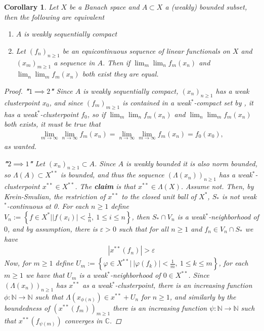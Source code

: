 \documentclass[10pt,twoside,openany,final]{memoir}
\theoremstyle{break}
\newtheorem{corollary}[section]{Corollary}
\theoremstyle{Break}
\newcommand{\C}{\mathbb{C}}
\newcommand{\N}{\mathbb{N}}
\begin{document}
\begin{corollary} \label{corollary of eberlein-smulian}
Let $X$ be a Banach space and $A\subset X$ a (weakly) bounded subset, then the following are equivalent
\begin{enumerate}
\item $A$ is weakly sequentially compact
\item Let $(f_{n})_{n\geq 1}$ be an equicontinuous sequence of linear functionals on $X$ and $(x_{m})_{m\geq 1}$ a sequence in $A$. Then if $\lim_{m} \lim_{n} f_{m} (x_{n})$ and $\lim_{n} \lim_{m} f_{m} (x_{n})$ both exist they are equal.
\end{enumerate}
\begin{proof}
\textbf{"$1 \implies 2$"}
Since $A$ is weakly sequentially compact, $(x_{n})_{n\geq 1}$ has a weak clusterpoint $x_{0}$, and since $(f_{m})_{m\geq1}$ is contained in a weak$^*$-compact set by , it has a weak$^*$-clusterpoint $f_{0}$, so if $\lim_{m} \lim_{n} f_{m} (x_{n})$ and $\lim_{n} \lim_{m} f_{m} (x_{n})$ both exists, it must be true that
\begin{align*}
\lim_{m\to \infty} \lim_{n\to \infty} f_{m}(x_{n})= \lim_{n\to \infty} \lim_{m \to \infty} f_{m}(x_{n})=f_{0}(x_{0}),
\end{align*}
as wanted.

\noindent \textbf{"$2 \implies 1$"} Let $(x_{n})_{n\geq 1} \subset A$. Since $A$ is weakly bounded it is also norm bounded, so $\Lambda(A)\subset X^{**}$ is bounded, and thus the sequence $(\Lambda(x_{n}))_{n\geq 1}$ has a weak$^*$-clusterpoint $x^{**}\in X^{**}$. The \textbf{claim} is that $x^{**} \in \Lambda(X)$. Assume not. Then, by Krein-Smulian, the restriction of $x^{**}$ to the closed unit ball of $X^*$, $S_{*}$ is not weak$^*$-continuous at 0. For each $n\geq 1$ define $V_{n}:=\left\{ f \in X^* \big| |f(x_{i})|<\frac{1}{n}, \ 1 \leq i \leq n \right\}$, then $S_{*} \cap V_{n}$ is a weak$^*$-neighborhood of $0$, and by assumption, there is $\varepsilon>0$ such that for all $n \geq 1$ and $f_{n} \in V_{n} \cap S_{*}$ we have
\begin{align*}
|x^{**} (f_{n})| > \varepsilon
\end{align*}
Now, for $m \geq 1$ define $U_{m}:= \left\{ \varphi \in X^{**} \big| \ |\varphi(f_{k})| < \frac{1}{m}, \ 1 \leq k \leq m  \right\}$, for each $m \geq 1$ we have that $U_{m}$ is a weak$^*$-neighborhood of $0 \in X^{**}$. Since $(\Lambda(x_{n}))_{n\geq 1}$ has $x^{**}$ as a weak$^*$-clusterpoint, there is an increasing function $\phi:\N \to \N$ such that $\Lambda(x_{\phi(n)}) \in x^{**}+U_{n}$ for $n \geq 1$, and similarly by the boundedness of $(x^{**}(f_{m}))_{m \geq 1}$ there is an increasing function $\psi:\N \to \N$ such that $x^{**}(f_{\psi(m)})$ converges in $\C$.


\end{proof}
\end{corollary}
\end{document}
